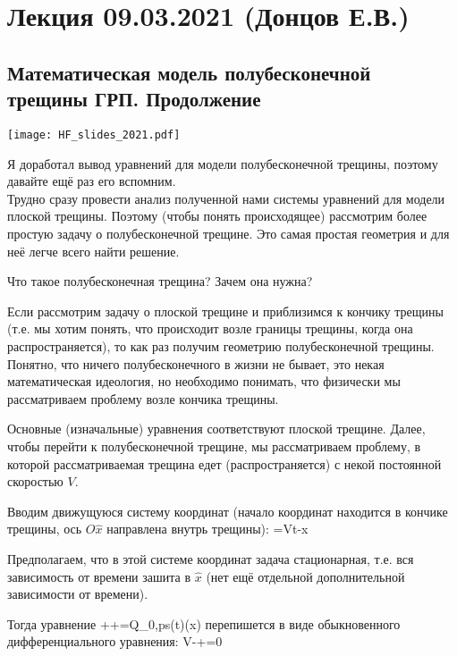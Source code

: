 \documentclass[main.tex]{subfiles}
\begin{document}

\section{Лекция 09.03.2021 (Донцов Е.В.)}

\subsection{Математическая модель полубесконечной трещины ГРП. Продолжение}

\texttt{[image: HF\_slides\_2021.pdf]}

Я доработал вывод уравнений для модели полубесконечной трещины, поэтому давайте ещё раз его вспомним.
\\

Трудно сразу провести анализ полученной нами системы уравнений для модели плоской трещины.
Поэтому (чтобы понять происходящее) рассмотрим более простую задачу о полубесконечной трещине.
Это самая простая геометрия и для неё легче всего найти решение.

Что такое полубесконечная трещина?
Зачем она нужна?

Если рассмотрим задачу о плоской трещине и приблизимся к кончику трещины (т.е. мы хотим понять, что происходит возле границы трещины, когда она распространяется), то как раз получим геометрию полубесконечной трещины.
Понятно, что ничего полубесконечного в жизни не бывает, это некая математическая идеология, но необходимо понимать, что физически мы рассматриваем проблему возле кончика трещины.

Основные (изначальные) уравнения соответствуют плоской трещине.
Далее, чтобы перейти к полубесконечной трещине, мы рассматриваем проблему, в которой рассматриваемая трещина едет (распространяется) с некой постоянной скоростью $V$.

Вводим движущуюся систему координат (начало координат находится в кончике трещины, ось $O\hat{x}$ направлена внутрь трещины):
\beq
{}=Vt-x
\eeq

Предполагаем, что в этой системе координат задача стационарная, т.е. вся зависимость от времени зашита в $\hat{x}$ (нет ещё отдельной дополнительной зависимости от времени).

Тогда уравнение
\beq
{}++=Q_{0,ps}(t)\delta(x)
\eeq
перепишется в виде обыкновенного дифференциального уравнения:
\beq
V-+=0
\eeq
\end{document}
